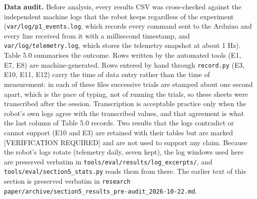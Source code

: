 \textbf{Data audit.} Before analysis, every results CSV was cross-checked against the independent machine logs that the robot keeps regardless of the experiment (\texttt{var/log/p1\_events.log}, which records every command sent to the Arduino and every line received from it with a millisecond timestamp, and \texttt{var/log/telemetry.log}, which stores the telemetry snapshot at about 1 Hz). Table 5.0 summarises the outcome. Rows written by the automated tools (E1, E7, E8) are machine-generated. Rows entered by hand through \texttt{record.py} (E3, E10, E11, E12) carry the time of data entry rather than the time of measurement: in each of these files successive trials are stamped about one second apart, which is the pace of typing, not of running the trials, so these sheets were transcribed after the session. Transcription is acceptable practice only when the robot's own logs agree with the transcribed values, and that agreement is what the last column of Table 5.0 records. Two results that the logs contradict or cannot support (E10 and E3) are retained with their tables but are marked [VERIFICATION REQUIRED] and are not used to support any claim. Because the robot's logs rotate (telemetry daily, seven kept), the log windows used here are preserved verbatim in \texttt{tools/eval/results/log\_excerpts/}, and \texttt{tools/eval/section5\_stats.py} reads them from there. The earlier text of this section is preserved verbatim in \texttt{research paper/archive/section5\_results\_pre-audit\_2026-10-22.md}.

